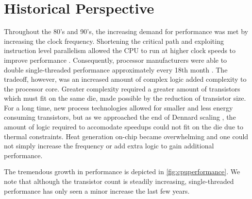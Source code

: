 \section{Historical Perspective}


Throughout the 80's and 90's, the increasing demand for performance was met by
increasing the clock frequency. Shortening the critical path and exploiting
instruction level parallelism allowed the CPU to run at higher clock speeds to
improve performance \cite{tanenbaum1984structured}. Consequently, processor
manufacturers were able to double single-threaded performance approximately
every 18th month \cite{moore1965cramming}. The tradeoff, however, was an
increased amount of complex logic added complexity to the processor core.
Greater complexity required a greater amount of transistors which must fit on
the same die, made possible by the reduction of transistor size. For a long
time, new process technologies allowed for smaller and less energy consuming
transistors, but as we approached the end of Dennard scaling
\cite{dennard1974design,esmaeilzadeh2011dark}, the amount of logic required to
accomodate speedups could not fit on the die due to thermal constraints. Heat
generation on-chip became overwhelming and one could not simply increase the
frequency or add extra logic to gain additional performance.

The tremendous growth in performance is depicted in
\autoref{fig:cpuperformance}. We note that although the transistor count is
steadily increasing, single-threaded performance has only seen a minor increase
the last few years.




